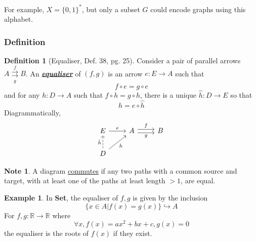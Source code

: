 \documentclass[11pt]{article} %
\theoremstyle{definition}
\newtheorem{definition}[theorem]{Definition}
\theoremstyle{definition}
\theoremstyle{definition}
\newtheorem{example/}[theorem]{Example}
\newtheorem{note}[theorem]{Note}
\newenvironment{example}
  {\renewcommand{\qedsymbol}{$\blacktriangle$}%
   \pushQED{\qed}\begin{example/}}
  {\popQED\end{example/}}
\begin{document}
For example, $X=\{0,1\}^{*}$, but only a subset $G$ could encode graphs using this alphabet.

\subsubsection{Definition}
\begin{definition}[Equaliser, Def. 38, pg. 25]
Consider a pair of parallel arrows $A\overset{f}{\underset{g}{\rightrightarrows}}B$.
An \textbf{\textit{\underline{equaliser}}} of $(f,g)$ is an arrow $e: E\rightarrow A$ such that
\[f\circ e = g\circ e\]
and for any $h:D\rightarrow A$ such that $f\circ h = g\circ h$, 
there is a unique $\hat{h}: D\rightarrow E$ so that
\[h = e\circ \hat{h}\]
Diagrammatically,
\[\begin{tikzcd}
	E & A & B \\
	D
	\arrow["f", shift left, from=1-2, to=1-3]
	\arrow["g"', shift right, from=1-2, to=1-3]
	\arrow["e", from=1-1, to=1-2]
	\arrow["h"', from=2-1, to=1-2]
	\arrow["{\hat{h}}", dashed, from=2-1, to=1-1]
\end{tikzcd}\]
\end{definition}

\begin{note}
    A diagram \underline{commutes} if any two paths with a common source and target, 
    with at least one of the paths at least length $>1$, are equal.
\end{note}

\begin{example}
    In \textbf{Set}, the equaliser of $f,g$ is given by the inclusion
    \[\{x\in A | f(x)=g(x)\} \hookrightarrow A\]
    For $f,g: \mathbb{R} \rightarrow \mathbb{R}$ where 
    \[\forall x, f(x)=ax^2+bx+c, g(x) =0\]
    the equaliser is the roots of $f(x)$ if they exist.
\end{example}
\end{document}
